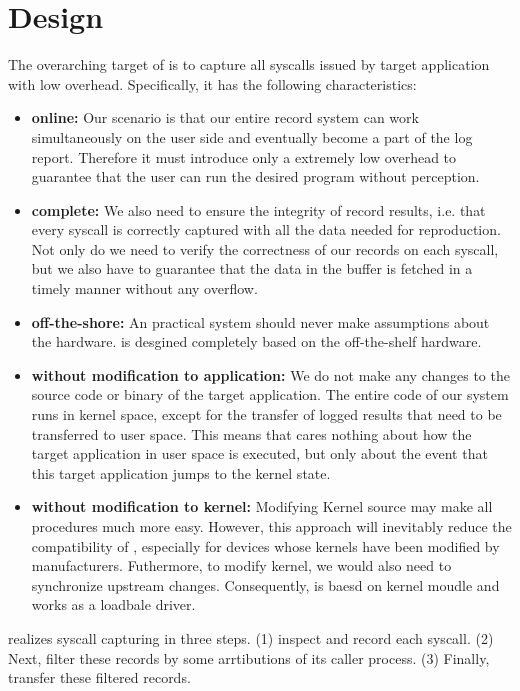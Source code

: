 \section{Design}
The overarching target of \TheName is to capture all syscalls issued by target application with low overhead. Specifically, it has the following characteristics:

\begin{itemize}
    \item \textbf{online:} Our scenario is that our entire record system can  work simultaneously on the user side and eventually become a part of the log report. Therefore it must introduce only a extremely low overhead to guarantee that the user can run the desired program without perception.
    \item \textbf{complete:} We also need to ensure the integrity of record results, i.e. that every syscall is correctly captured with all the data needed for reproduction. Not only do we need to verify the correctness of our records on each syscall, but we also have to guarantee that the data in the buffer is fetched in a timely manner without any overflow.
    \item \textbf{off-the-shore:} An practical system should never make assumptions about the hardware. \TheName is desgined completely based on the off-the-shelf hardware.
    \item \textbf{without modification to application:} We do not make any changes to the source code or binary of the target application. The entire code of our system runs in kernel space, except for the transfer of logged results that need to be transferred to user space. This means that \TheName cares nothing about how the target application in user space is executed, but only about the event that this target application jumps to the kernel state.
    \item \textbf{without modification to kernel:} Modifying Kernel source may make all procedures much more easy. However, this approach will inevitably reduce the compatibility of \TheName, especially for devices whose kernels have been modified by manufacturers. Futhermore, to modify kernel, we would also need to synchronize upstream changes. Consequently, \TheName is baesd on kernel moudle and works as a loadbale driver.
\end{itemize}


\TheName realizes syscall capturing in three steps. (1) \TheName inspect and record each syscall. (2) Next, \TheName filter these records by some arrtibutions of its caller process. (3) Finally, \TheName transfer these filtered records.

